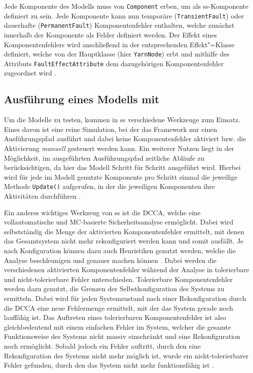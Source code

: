 Jede Komponente des Modells muss von \texttt{Component} erben, um als \gls{ss}-Komponente definiert zu sein.
Jede Komponente kann nun temporäre (\texttt{TransientFault}) oder dauerhafte (\texttt{PermanentFault}) Komponentenfehler enthalten, welche zunächst innerhalb der Komponente als Felder definiert werden. 
Der Effekt eines Komponentenfehlers wird anschließend in der entsprechenden Effekt"=Klasse definiert, welche von der Hauptklasse (hier \texttt{YarnNode}) erbt und mithilfe des Attributs \texttt{FaultEffectAttribute} dem dazugehörigen Komponentenfehler zugeordnet wird \cite{Habermaier2016}.

\subsection{Ausführung eines Modells mit }
\label{subsec:ssharpExecution}

Um die Modelle zu testen, kommen in \gls{ss} verschiedene Werkzeuge zum Einsatz.
Eines davon ist eine reine Simulation, bei der das Framework nur einen Ausführungspfad ausführt und dabei keine Komponentenfehler aktiviert bzw. die Aktivierung \textit{manuell} gesteuert werden kann.
Ein weiterer Nutzen liegt in der Möglichkeit, im ausgeführten Ausführungspfad zeitliche Abläufe zu berücksichtigen, da hier das Modell Schritt für Schritt ausgeführt wird.
Hierbei wird für jede im Modell genutzte Komponente pro Schritt einmal die jeweilige Methode \texttt{Update()} aufgerufen, in der die jeweiligen Komponenten ihre Aktivitäten durchführen \cite{Habermaier2016}.

Ein anderes wichtiges Werkzeug von \gls{ss} ist die \gls{DCCA}, welche eine vollautomatische und \gls{MC}-basierte Sicherheitsanalyse ermöglicht.
Dabei wird selbstständig die Menge der aktivierten Komponentenfehler ermittelt, mit denen das Gesamtsystem nicht mehr rekonfiguriert werden kann und somit ausfällt.
Je nach Konfiguration können dazu auch Heuristiken genutzt werden, welche die Analyse beschleunigen und genauer machen können \cite{Eberhardinger2016}.
Dabei werden die verschiedenen aktivierten Komponentenfehler während der Analyse in tolerierbare und nicht-tolerierbare Fehler unterschieden.
Tolerierbare Komponentenfehler werden dazu genutzt, die Grenzen der Selbstkonfiguration des Systems zu ermitteln.
Dabei wird für jeden Systemzustand nach einer Rekonfiguration durch die \gls{DCCA} eine neue Fehlermenge ermittelt, mit der das System gerade noch lauffähig ist.
Das Auftreten eines tolerierbaren Komponentenfehler ist also gleichbedeutend mit einem einfachen Fehler im System, welcher die gesamte Funktionsweise des Systems nicht massiv einschränkt und eine Rekonfiguration noch ermöglicht.
Sobald jedoch ein Fehler auftritt, durch den eine Rekonfiguration des Systems nicht mehr möglich ist, wurde ein nicht-tolerierbarer Fehler gefunden, durch den das System nicht mehr funktionsfähig ist \cite{Habermaier2015}.

